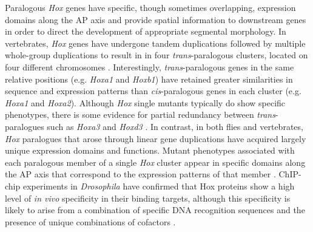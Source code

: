 Paralogous \emph{Hox} genes have specific, though sometimes overlapping, expression domains along the AP axis and provide spatial information to downstream genes in order to direct the development of appropriate segmental morphology. In vertebrates, \emph{Hox} genes have undergone tandem duplications followed by multiple whole-group duplications to result in in four \emph{trans}-paralogous clusters, located on four different chromosomes \citep{foronda_function_2009,maconochie_paralogous_1996}. Interestingly, \emph{trans}-paralogous genes in the same relative positions (e.g. \emph{Hoxa1} and \emph{Hoxb1}) have retained greater similarities in sequence and expression patterns than \emph{cis}-paralogous genes in each cluster (e.g. \emph{Hoxa1} and \emph{Hoxa2}). Although \emph{Hox} single mutants typically do show specific phenotypes, there is some evidence for partial redundancy between \emph{trans}-paralogues such as \emph{Hoxa3} and \emph{Hoxd3} \citep{greer_maintenance_2000}. In contrast, in both flies and vertebrates, \emph{Hox} paralogues that arose through linear gene duplications have acquired largely unique expression domains and functions. Mutant phenotypes associated with each paralogous member of a single \emph{Hox} cluster appear in specific domains along the AP axis that correspond to the expression patterns of that member \citep{maconochie_paralogous_1996}. ChIP-chip experiments in \emph{Drosophila} have confirmed that Hox proteins show a high level of \emph{in vivo} specificity in their binding targets, although this specificity is likely to arise from a combination of specific DNA recognition sequences and the presence of unique combinations of cofactors \citep{hueber_comparative_2007,hueber_shaping_2008,mann_chapter_2009}.\\

